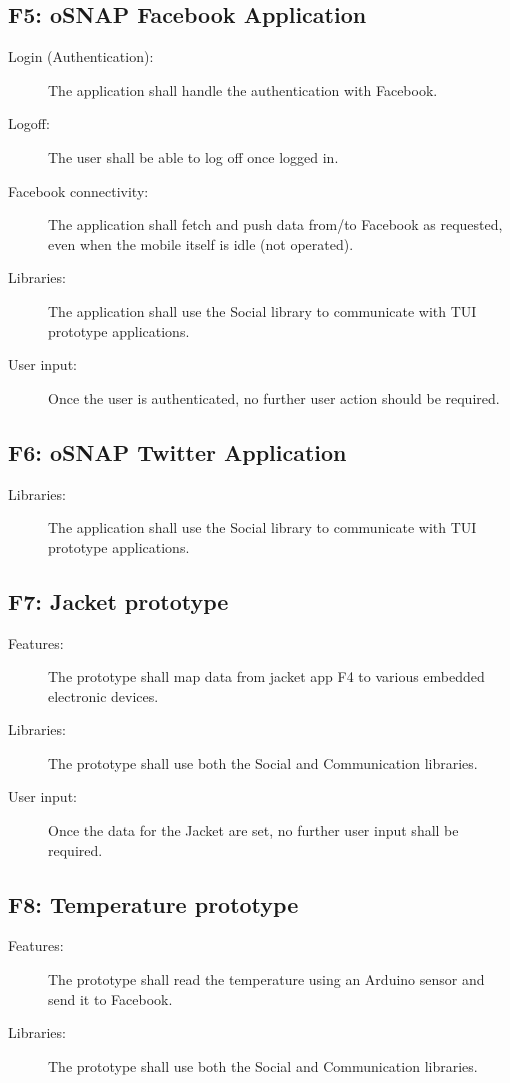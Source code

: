 \subsection{F5: oSNAP Facebook Application}
\begin{description}
	\item[Login (Authentication):] The application shall handle the
	authentication with Facebook.
	\item[Logoff:] The user shall be able to log off once logged in.
	\item[Facebook connectivity:] The application shall fetch and push data
	from/to Facebook as requested, even when the mobile itself is idle
	(not operated).
	\item[Libraries:] The application shall use the Social library to
	communicate with TUI prototype applications.
	\item[User input:] Once the user is authenticated, no further user action
	should be required.
\end{description}

\subsection{F6: oSNAP Twitter Application}
\begin{description}
	\item[Libraries:] The application shall use the Social library to
	communicate with TUI prototype applications.
\end{description}

\subsection{F7: Jacket prototype}
\begin{description}
	\item[Features:] The prototype shall map data from jacket app F4 to various
	embedded electronic devices.
	\item[Libraries:] The prototype shall use both the Social and Communication
	libraries.
	\item[User input:] Once the data for the Jacket are set, no further user
	input shall be required.
\end{description}

\subsection{F8: Temperature prototype}
\begin{description}
	\item[Features:] The prototype shall read the temperature using an Arduino
	sensor and send it to Facebook.
	\item[Libraries:] The prototype shall use both the Social and Communication
	libraries.
\end{description}
	
